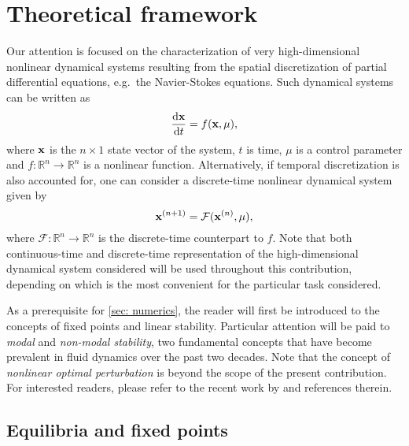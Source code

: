 \section{Theoretical framework}
\label{sec: theory}

  Our attention is focused on the characterization of very high-dimensional nonlinear dynamical systems resulting from the spatial discretization of partial differential equations, e.g.\ the Navier-Stokes equations. Such dynamical systems can be written as
  \begin{equation}
    \displaystyle \frac{\mathrm{d} {\bf x}}{\mathrm{d}t} = f({\bf x}, \mu),
    \label{eq: continuous-time dynamical system}
  \end{equation}
  where ${\bf x}$ is the $n \times 1$ state vector of the system, $t$ is time, $\mu$ is a control parameter and $f : \mathbb{R}^n \to \mathbb{R}^n $ is a nonlinear function. Alternatively, if temporal discretization is also accounted for, one can consider a discrete-time nonlinear dynamical system given by
  \begin{equation}
    {\bf x}^{(n+1)} = \mathcal{F} ( {\bf x}^{(n)}, \mu ),
    \label{eq: discrete-time dynamical system}
  \end{equation}
  where $\mathcal{F} : \mathbb{R}^n \to \mathbb{R}^n$ is the discrete-time counterpart to $f$. Note that both continuous-time and discrete-time representation of the high-dimensional dynamical system considered will be used throughout this contribution, depending on which is the most convenient for the particular task considered.

  As a prerequisite for \textsection \ref{sec: numerics}, the reader will first be introduced to the concepts of fixed points and linear stability. Particular attention will be paid to \emph{modal} and \emph{non-modal stability}, two fundamental concepts that have become prevalent in fluid dynamics over the past two decades. Note that the concept of \emph{nonlinear optimal perturbation} is beyond the scope of the present contribution. For interested readers, please refer to the recent work by \cite{???} and references therein.



  \subsection{Equilibria and fixed points}
  \label{subsec: theory-fixed points}

